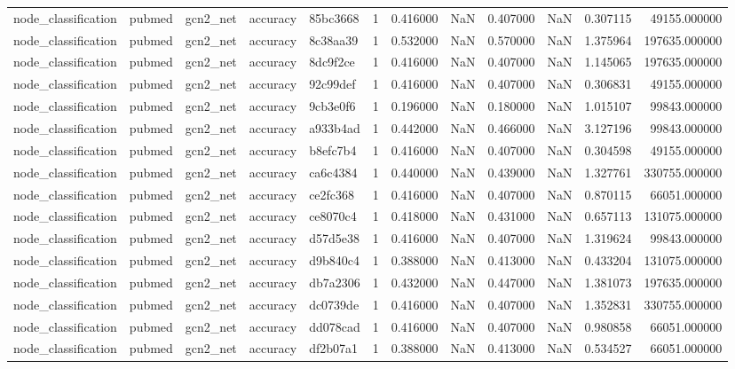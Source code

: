 \begin{tabular}{lllllrrrrrrr}
node_classification & pubmed & gcn2_net & accuracy & 85bc3668 & 1 & 0.416000 & NaN & 0.407000 & NaN & 0.307115 & 49155.000000 \\
node_classification & pubmed & gcn2_net & accuracy & 8c38aa39 & 1 & 0.532000 & NaN & 0.570000 & NaN & 1.375964 & 197635.000000 \\
node_classification & pubmed & gcn2_net & accuracy & 8dc9f2ce & 1 & 0.416000 & NaN & 0.407000 & NaN & 1.145065 & 197635.000000 \\
node_classification & pubmed & gcn2_net & accuracy & 92c99def & 1 & 0.416000 & NaN & 0.407000 & NaN & 0.306831 & 49155.000000 \\
node_classification & pubmed & gcn2_net & accuracy & 9cb3e0f6 & 1 & 0.196000 & NaN & 0.180000 & NaN & 1.015107 & 99843.000000 \\
node_classification & pubmed & gcn2_net & accuracy & a933b4ad & 1 & 0.442000 & NaN & 0.466000 & NaN & 3.127196 & 99843.000000 \\
node_classification & pubmed & gcn2_net & accuracy & b8efc7b4 & 1 & 0.416000 & NaN & 0.407000 & NaN & 0.304598 & 49155.000000 \\
node_classification & pubmed & gcn2_net & accuracy & ca6c4384 & 1 & 0.440000 & NaN & 0.439000 & NaN & 1.327761 & 330755.000000 \\
node_classification & pubmed & gcn2_net & accuracy & ce2fc368 & 1 & 0.416000 & NaN & 0.407000 & NaN & 0.870115 & 66051.000000 \\
node_classification & pubmed & gcn2_net & accuracy & ce8070c4 & 1 & 0.418000 & NaN & 0.431000 & NaN & 0.657113 & 131075.000000 \\
node_classification & pubmed & gcn2_net & accuracy & d57d5e38 & 1 & 0.416000 & NaN & 0.407000 & NaN & 1.319624 & 99843.000000 \\
node_classification & pubmed & gcn2_net & accuracy & d9b840c4 & 1 & 0.388000 & NaN & 0.413000 & NaN & 0.433204 & 131075.000000 \\
node_classification & pubmed & gcn2_net & accuracy & db7a2306 & 1 & 0.432000 & NaN & 0.447000 & NaN & 1.381073 & 197635.000000 \\
node_classification & pubmed & gcn2_net & accuracy & dc0739de & 1 & 0.416000 & NaN & 0.407000 & NaN & 1.352831 & 330755.000000 \\
node_classification & pubmed & gcn2_net & accuracy & dd078cad & 1 & 0.416000 & NaN & 0.407000 & NaN & 0.980858 & 66051.000000 \\
node_classification & pubmed & gcn2_net & accuracy & df2b07a1 & 1 & 0.388000 & NaN & 0.413000 & NaN & 0.534527 & 66051.000000 \\

\end{tabular}
